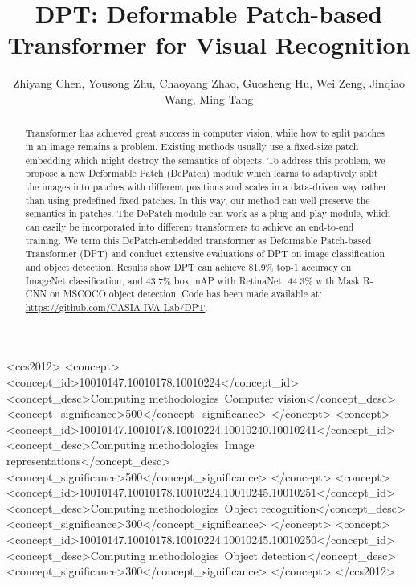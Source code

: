 \documentclass[sigconf,screen]{acmart}
\begin{document}
\fancyhead{}

\title{DPT: Deformable Patch-based Transformer for Visual Recognition}

\author{Zhiyang Chen, Yousong Zhu, Chaoyang Zhao, Guosheng Hu, Wei Zeng, Jinqiao Wang, Ming Tang}

\renewcommand{\shortauthors}{Zhiyang Chen, et al.}

\begin{abstract}
  Transformer has achieved great success in computer vision, while how to split patches in an image remains a problem. 
  Existing methods usually use a fixed-size patch embedding which might destroy the semantics of objects. To address this problem, 
  we propose a new Deformable Patch (DePatch) module which learns to adaptively split the images into patches with different positions and scales in a data-driven way rather than 
  using predefined fixed patches. In this way, our method can well preserve the semantics in patches.
  The DePatch module can work as a plug-and-play module, which can easily be incorporated into different transformers to achieve an end-to-end training.  We term this DePatch-embedded transformer as Deformable Patch-based  Transformer (DPT) and conduct extensive evaluations of DPT on image classification and object detection. Results show DPT can achieve 81.9\% top-1 accuracy on ImageNet classification, and 43.7\% box mAP with RetinaNet, 44.3\% with Mask R-CNN on MSCOCO object detection. Code has been made available at: \url{https://github.com/CASIA-IVA-Lab/DPT}.
\end{abstract}

\begin{CCSXML}
<ccs2012>
   <concept>
       <concept_id>10010147.10010178.10010224</concept_id>
       <concept_desc>Computing methodologies~Computer vision</concept_desc>
       <concept_significance>500</concept_significance>
       </concept>
   <concept>
       <concept_id>10010147.10010178.10010224.10010240.10010241</concept_id>
       <concept_desc>Computing methodologies~Image representations</concept_desc>
       <concept_significance>500</concept_significance>
       </concept>
   <concept>
       <concept_id>10010147.10010178.10010224.10010245.10010251</concept_id>
       <concept_desc>Computing methodologies~Object recognition</concept_desc>
       <concept_significance>300</concept_significance>
       </concept>
   <concept>
       <concept_id>10010147.10010178.10010224.10010245.10010250</concept_id>
       <concept_desc>Computing methodologies~Object detection</concept_desc>
       <concept_significance>300</concept_significance>
       </concept>
 </ccs2012>
\end{CCSXML}
\end{document}
